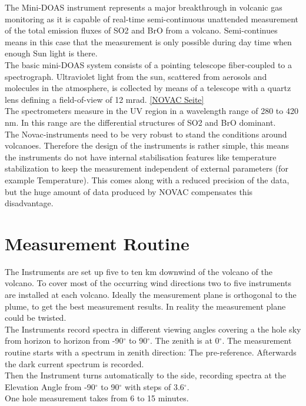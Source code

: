 \documentclass  [
  paper    = a4,
  BCOR     = 10mm,
  twoside,
  fontsize = 12pt,
  fleqn,
  toc      = bibnumbered,
  toc      = listofnumbered,
  numbers  = noendperiod,
  headings = normal,
  listof   = leveldown,
  version  = 3.03
]                                       {scrreprt}
\begin{document}
		The  Mini-DOAS  instrument  represents  a  major  breakthrough  in  volcanic  gas	monitoring as it is capable of real-time semi-continuous unattended measurement of the total emission fluxes of  SO2	and BrO from a volcano. Semi-continues means in this case that the measurement is only possible during day time when enough Sun light is there.\\
		The  basic  mini-DOAS  system  consists  of  a  pointing  telescope  fiber-coupled  to  a  spectrograph.  
		Ultraviolet light from the sun, scattered from aerosols and molecules in the atmosphere, is collected by 
		means  of  a  telescope  with  a  quartz  lens  defining  a  field-of-view  of  12  mrad.
		\ref{NOVAC Seite} \\
		The spectrometers measure in the UV region in a wavelength range of 280 to 420 nm. In this range are the differential structures of SO2 and BrO dominant.
		\\
 		The Novac-instruments need to be very robust to stand the conditions around volcanoes. Therefore the design of the instruments is rather simple, this means the instruments do not have internal stabilisation features like temperature stabilization to keep the measurement independent of external parameters (for example Temperature).
		This comes along with a reduced precision of the data, but the huge amount of data produced by NOVAC compensates this disadvantage.  
	
	
	\chapter{Measurement Routine}
	The Instruments are set up five to ten km downwind of the volcano of the volcano. To cover most of the occurring wind directions two to five instruments are installed at each volcano. Ideally the measurement plane is orthogonal to the plume, to get the best measurement results. In reality the measurement plane could be twisted.\\
	The Instruments record spectra in different viewing angles covering a the hole sky from horizon to horizon from 
	-90$^{\circ}$ to 90$^{\circ}$. The zenith is at 0$^{\circ}$.
	The measurement routine starts with a spectrum in zenith direction: The pre-reference.
	Afterwards the dark current spectrum is recorded.\\
	Then the Instrument turns automatically to the side, recording spectra at the Elevation Angle from -90$^{\circ}$ to 90$^{\circ}$ with steps of 3.6$^{\circ}$. \\
	One hole measurement takes from 6 to 15 minutes.
\end{document}
